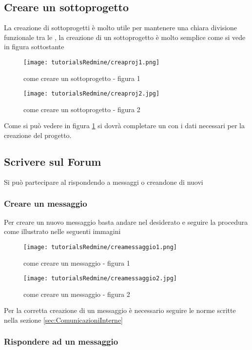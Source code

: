 \documentclass{scalatekids-article}
\begin{document}
\subsection{Creare un sottoprogetto}

La creazione di sottoprogetti è molto utile per mantenere una chiara divisione funzionale tra le , la creazione di un sottoprogetto è molto semplice come si vede in figura sottostante
\begin{figure}[H]
    \centering
    \texttt{[image: tutorialsRedmine/creaproj1.png]}
    \caption{come creare un sottoprogetto - figura 1}
\end{figure}
\begin{figure}[H]
    \centering
    \texttt{[image: tutorialsRedmine/creaproj2.jpg]}
    \caption{come creare un sottoprogetto - figura 2\label{fig:figura-2}}
\end{figure}
Come si può vedere in figura \ref{fig:figura-2} si dovrà completare un  con i dati necessari per la creazione del progetto.

\subsection{Scrivere sul Forum}

Si può partecipare al  rispondendo a messaggi o creandone di nuovi

\subsubsection{Creare un messaggio}

Per creare un nuovo messaggio basta andare nel  desiderato e seguire la procedura come illustrato nelle seguenti immagini
\begin{figure}[H]
    \centering
    \texttt{[image: tutorialsRedmine/creamessaggio1.png]}
    \caption{come creare un messaggio - figura 1}
\end{figure}
\begin{figure}[H]
    \centering
    \texttt{[image: tutorialsRedmine/creamessaggio2.jpg]}
    \caption{come creare un messaggio - figura 2}
\end{figure}
Per la corretta creazione di un messaggio è necessario seguire le norme scritte nella sezione \ref{sec:ComunicazioniInterne}

\subsubsection{Rispondere ad un messaggio}
\end{document}
